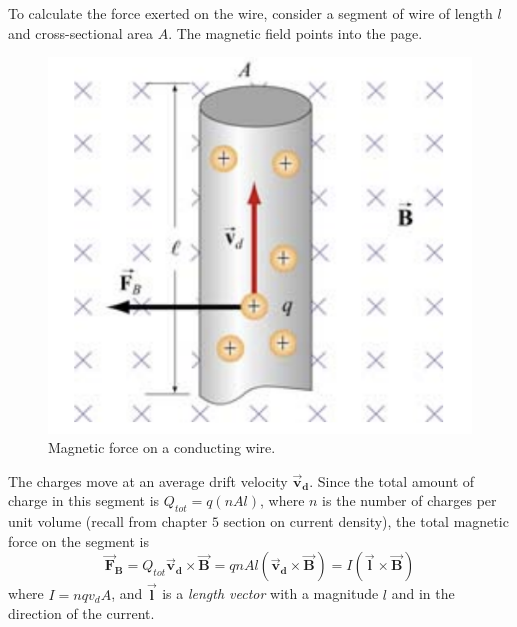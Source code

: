 \documentclass[11pt, letterpaper]{article}
\theoremstyle{definition}
\theoremstyle{remark}
\newcommand{\bv}[2][]{\bm{\vec{#2}_{#1}}}
\begin{document}
To calculate the force exerted on the wire, consider a segment of wire of length $l$ and cross-sectional area $A$. The magnetic field points into the page. 
\begin{figure}[h!]
	\centering
	\includegraphics[scale=0.6]{wire}
	\caption{Magnetic force on a conducting wire.}
	\label{fig:wire}
\end{figure}

The charges move at an average drift velocity $\bv[d]{v}$. Since the total amount of charge in this segment is $Q_{tot} = q(nAl)$, where $n$ is the number of charges per unit volume (recall from chapter $5$ section on current density), the total magnetic force on the segment is \[\bv[B]{F} = Q_{tot}\bv[d]{v}\times\bv{B} = qnAl(\bv[d]{v}\times\bv{B}) = I(\bv{l}\times\bv{B})\] where $I = nqv_dA$, and $\bv{l}$ is a \textit{length vector} with a magnitude $l$ and in the direction of the current.
\end{document}
